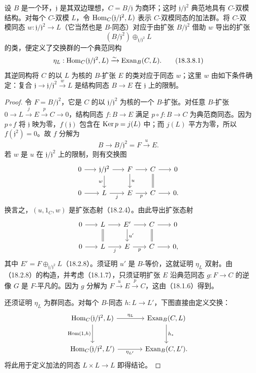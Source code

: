 设 $B$ 是一个环，$\mathfrak j$ 是其双边理想，$C=B/\mathfrak j$ 为商环；这时 $\mathfrak j/\mathfrak j^2$ 典范地具有 $C$-双模结构。对每个 $C$-双模 $L$，令 $\operatorname{Hom}_C(\mathfrak j/\mathfrak j^2,L)$ 表示 $C$-双模同态的加法群。将 $C$-双模同态 $w:\mathfrak j/\mathfrak j^2\to L$（它当然也是 $B$-同态）对应于由扩张 $B/\mathfrak j^2$ 借助 $w$ 导出的扩张
\[
 (B/\mathfrak j^2)\oplus_{\mathfrak j/\mathfrak j^2}L
\]
的类，便定义了交换群的一个典范同构
\begin{equation}
 \eta_L:\operatorname{Hom}_C(\mathfrak j/\mathfrak j^2,L)
 \xrightarrow{\sim}\operatorname{Exan}_B(C,L).
 \tag{18.3.8.1}
\end{equation}
其逆同构将 $C$ 的以 $L$ 为核的 $B$-扩张 $E$ 的类对应于同态 $w$；这里 $w$ 由如下条件确定：复合 $\mathfrak j\to\mathfrak j/\mathfrak j^2\xrightarrow{w}L$ 是结构同态 $B\to E$ 在 $\mathfrak j$ 上的限制。
\begin{proof}
令 $F=B/\mathfrak j^2$，它是 $C$ 的以 $\mathfrak j/\mathfrak j^2$ 为核的一个 $B$-扩张。对任意 $B$-扩张 $0\to L\xrightarrow{j}E\xrightarrow{p}C\to0$，结构同态 $f:B\to E$ 满足 $p\circ f:B\to C$ 为典范商同态。因为 $p\circ f$ 将 $\mathfrak j$ 映为零，$f(\mathfrak j)$ 包含在 $\operatorname{Ker} p=j(L)$ 中；而 $j(L)$ 平方为零，所以 $f(\mathfrak j^2)=0$。故 $f$ 分解为
\[
 B\longrightarrow B/\mathfrak j^2=F\xrightarrow{u}E.
\]
若 $w$ 是 $u$ 在 $\mathfrak j/\mathfrak j^2$ 上的限制，则有交换图
\[
\begin{tikzcd}[column sep=1.7em]
0\arrow[r]&\mathfrak j/\mathfrak j^2\arrow[r]\arrow[d,"w"']&F\arrow[r]\arrow[d,"u"]&C\arrow[r]\arrow[d,equal]&0\\
0\arrow[r]&L\arrow[r,"j"']&E\arrow[r,"p"']&C\arrow[r]&0.
\end{tikzcd}
\]
换言之，$(u,1_C,w)$ 是扩张态射（18.2.4）。由此导出扩张态射
\[
\begin{tikzcd}[column sep=1.8em]
0\arrow[r]&L\arrow[r]\arrow[d,equal]&E'\arrow[r]\arrow[d,"u'"]&C\arrow[r]\arrow[d,equal]&0\\
0\arrow[r]&L\arrow[r,"j"']&E\arrow[r,"p"']&C\arrow[r]&0,
\end{tikzcd}
\]
其中 $E'=F\oplus_{\mathfrak j/\mathfrak j^2}L$（18.2.8）。须证明 $u'$ 是 $B$-等价，这就证明 $\eta_L$ 双射。由（18.2.8）的构造，并考虑（18.1.7），只须证明扩张 $E$ 沿典范同态 $g:F\to C$ 的逆像 $G$ 是 $F$-平凡的。因为 $g$ 分解为 $F\xrightarrow{u}E\xrightarrow{p}C$，这由（18.1.6）得到。

还须证明 $\eta_L$ 为群同态。对每个 $B$-同态 $h:L\to L'$，下图直接由定义交换：
\[
\begin{tikzcd}[column sep=large,row sep=large]
\Hom_C(\mathfrak j/\mathfrak j^2,L)\arrow[r,"\eta_L"]\arrow[d,"{\Hom(1,h)}"']&
\Exan_B(C,L)\arrow[d,"h_*"]\\
\Hom_C(\mathfrak j/\mathfrak j^2,L')\arrow[r,"\eta_{L'}"']&\Exan_B(C,L').
\end{tikzcd}
\]
将此用于定义加法的同态 $L\times L\to L$ 即得结论。
\end{proof}
